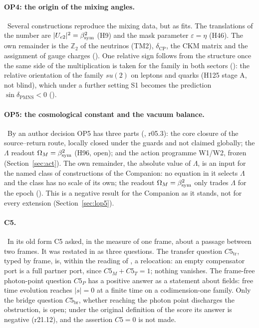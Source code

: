 \paragraph{OP4: the origin of the mixing angles.} \Open\ Several constructions reproduce the mixing data, but as fits.
The translations of the number are $|U_{e2}|^2=\beta_{\mathrm{sym}}^2$ (H9) and the mask parameter $\varepsilon=\eta$ (H46). The own
remainder is the $\mathbb Z_2$ of the neutrinos (TM2), $\delta_{\mathrm{CP}}$, the CKM matrix and the assignment of gauge
charges (). One relative sign follows from the structure once the same side of the multiplication is taken
for the family in both sectors (): the relative orientation of the family $su(2)$ on leptons and quarks (H125 stage A, not blind), which under a
further setting S1 becomes the prediction $\sin\delta_{\mathrm{PMNS}}<0$ ().

\paragraph{OP5: the cosmological constant and the vacuum balance.} \Open\ By an author decision OP5 has three parts
(, r05.3): the core closure of the source--return route, locally closed under the guards and not claimed
globally; the $\Lambda$ readout $\Omega_M=\beta_{\mathrm{sym}}^2$ (H96, open); and the action programme W1/W2, frozen
(Section~\ref{sec:act}). The own remainder, the absolute value of $\Lambda$, is an input for the named class of
constructions of the Companion: no equation in it selects $\Lambda$ and the class has no scale of its own; the readout
$\Omega_M=\beta_{\mathrm{sym}}^2$ only trades $\Lambda$ for the epoch (). This is a negative result for the Companion as it
stands, not for every extension (Section~\ref{sec:lop5}).

\paragraph{C5.} \Open\ In its old form C5 asked, in the measure of one frame, about a passage between two frames. It was
restated in  as three questions. The transfer question $C5_{\mathrm{tr}}$, typed by frame, is, within the reading of , a relocation: an
empty compensator port is a full partner port, since $C5_M+C5_T=1$; nothing vanishes. The frame-free photon-point
question $C5_P$ has a positive answer as a statement about fields: free time evolution reaches $|s|=0$ at a finite time
on a codimension-one family. Only the bridge question $C5_{\mathrm{br}}$, whether reaching the photon point discharges the
obstruction, is open; under the original definition of the score its answer is negative (r21.12), and the assertion
$C5=0$ is not made.

